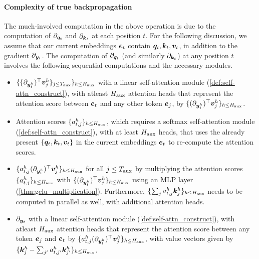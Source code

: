\paragraph{Complexity of true backpropagation} The much-involved computation in the above operation is due to the computation of $\partial_{{\bm{q}}_t}$ and $\partial_{{\bm{k}}_t}$ at each position $t$. For the following discussion, we assume that our current embeddings $\ve_t$ contain ${\bm{q}}_t, {\bm{k}}_t, {\bm{v}}_t$, in addition to the gradient $\partial_{{\bm{y}}_t}$. The computation of $\partial_{{\bm{q}}_t}$ (and similarly $\partial_{{\bm{k}}_t}$) at any position $t$ involves the following sequential computations and the necessary \simulator{} modules.
\begin{itemize}
    \item  $\{ \{ \partial_{{\bm{y}}_t^h})^{\top} {\bm{v}}^{h}_j \}_{ j \le T_{\text{aux}} } \}_{ h \le H_{\text{aux}} }$ with a \simulator{} linear self-attention module (\cref{def:self-attn_construct}), with atleast $H_{\text{aux}}$ attention heads that represent the attention score between $\ve_t$ and any other token $\ve_j$, by $\{ (\partial_{{\bm{y}}_t^h})^{\top} {\bm{v}}^{h}_j  \}_{ h \le H_{\text{aux}} }$.

    \item Attention scores $\{ a^h_{t, j} \}_{h \le H_{\text{aux}}}$, which requires a \simulator{} softmax self-attention module (\cref{def:self-attn_construct}), with at least $H_{\text{aux}}$ heads, that uses the already present $\{{\bm{q}}_t, {\bm{k}}_t, {\bm{v}}_t\}$ in the current embeddings $\ve_t$ to re-compute the attention scores. 

    \item $\{ a_{t, j}^h (\partial_{{\bm{y}}_t^h})^{\top} {\bm{v}}^{h}_j  \}_{h \le H_{\text{aux}}}$ for all $j \le T_{\text{aux}}$ by multiplying the attention scores $\{ a_{t, j}^h \}_{h \le  H_{\text{aux}}}$ with $\{ (\partial_{{\bm{y}}_t^h})^{\top} {\bm{v}}^{h}_j \}_{h \le H_{\text{aux}}}$ using an MLP layer (\cref{thm:gelu_multiplication}). Furthermore, $\{ \sum_{j} a^h_{t, j} {\bm{k}}^{h}_{j} \}_{ h \le H_{\text{aux}} }$ needs to be computed in parallel as well, with additional attention heads.   
    
    \item  $\partial_{ {\bm{y}}_t }$ with a \simulator{} linear self-attention module (\cref{def:self-attn_construct}), with atleast $H_{\text{aux}}$ attention heads that represent the attention score between any token $\ve_j$ and $\ve_t$ by $\{ a_{t, j}^h (\partial_{{\bm{y}}_t^h})^{\top} {\bm{v}}^{h}_j  \}_{h \le H_{\text{aux}}}$, with value vectors given by $\{ {\bm{k}}^h_j - \sum_{j'} a^h_{t, j'} {\bm{k}}^{h}_{j'} \}_{ h \le H_{\text{aux}} }$. 
\end{itemize}

